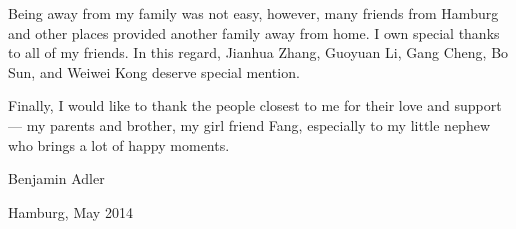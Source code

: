 Being away from my family was not easy, however, many friends from Hamburg and other places provided another family away from home. I own special thanks to all of my friends. In this regard, Jianhua Zhang, Guoyuan Li, Gang Cheng, Bo Sun, and Weiwei Kong deserve special mention.

Finally, I would like to thank the people closest to me for their love and support --- my parents and brother, my girl friend Fang, especially to my little nephew who brings a lot of happy moments.  
\fi

\vspace*{5mm}

\hfill Benjamin Adler

\hfill Hamburg, May 2014
